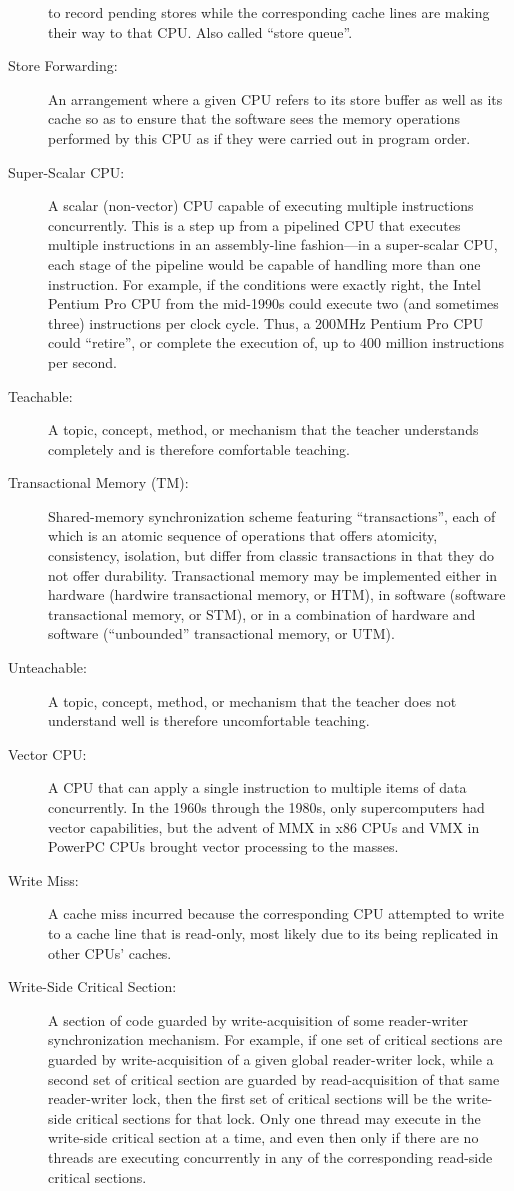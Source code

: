 \begin{description}
	to record pending stores
	while the corresponding cache lines are making their
	way to that CPU.
	Also called ``store queue''.
\item[Store Forwarding:]
	An arrangement where a given CPU refers to its store buffer
	as well as its cache so as to ensure that the software sees
	the memory operations performed by this CPU as if they
	were carried out in program order.
\item[Super-Scalar CPU:]
	A scalar (non-vector) CPU capable of executing multiple instructions
	concurrently.
	This is a step up from a pipelined CPU that executes multiple
	instructions in an assembly-line fashion---in a super-scalar
	CPU, each stage of the pipeline would be capable of handling
	more than one instruction.
	For example, if the conditions were exactly right,
	the Intel Pentium Pro CPU from the mid-1990s could
	execute two (and sometimes three) instructions per clock cycle.
	Thus, a 200MHz Pentium Pro CPU could ``retire'', or complete the
	execution of, up to 400 million instructions per second.
\item[Teachable:]
	A topic, concept, method, or mechanism that the teacher understands
	completely and is therefore comfortable teaching.
\item[Transactional Memory (TM):]
	Shared-memory synchronization scheme featuring ``transactions'',
	each of which is an atomic sequence of operations
	that offers atomicity, consistency, isolation, but differ from
	classic transactions in that they do not offer
	durability.
	Transactional memory may be implemented either in hardware
	(hardwire transactional memory, or HTM), in software (software
	transactional memory, or STM), or in a combination of hardware
	and software (``unbounded'' transactional memory, or UTM).
\item[Unteachable:]
	A topic, concept, method, or mechanism that the teacher does
	not understand well is therefore uncomfortable teaching.
\item[Vector CPU:]
	A CPU that can apply a single instruction to multiple items of
	data concurrently.
	In the 1960s through the 1980s, only supercomputers had vector
	capabilities, but the advent of MMX in x86 CPUs and VMX in
	PowerPC CPUs brought vector processing to the masses.
\item[Write Miss:]
	A cache miss incurred because the corresponding CPU attempted
	to write to a cache line that is read-only, most likely due
	to its being replicated in other CPUs' caches.
\item[Write-Side Critical Section:]
	A section of code guarded by write-acquisition of
	some reader-writer synchronization mechanism.
	For example, if one set of critical sections are guarded by
	write-acquisition of
	a given global reader-writer lock, while a second set of critical
	section are guarded by read-acquisition of that same reader-writer
	lock, then the first set of critical sections will be the
	write-side critical sections for that lock.
	Only one thread may execute in the write-side critical section
	at a time, and even then only if there are no threads are
	executing concurrently in any of the corresponding read-side
	critical sections.
\end{description}
